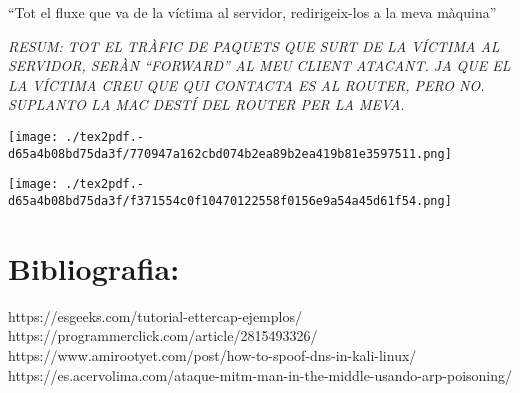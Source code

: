 \documentclass[]{article}
\begin{document}
``Tot el fluxe que va de la víctima al servidor, redirigeix-los a la
meva màquina''

\emph{RESUM: TOT EL TRÀFIC DE PAQUETS QUE SURT DE LA VÍCTIMA AL
SERVIDOR, SERÀN ``FORWARD'' AL MEU CLIENT ATACANT. JA QUE EL LA VÍCTIMA
CREU QUE QUI CONTACTA ES AL ROUTER, PERO NO. SUPLANTO LA MAC DESTÍ DEL
ROUTER PER LA MEVA.}

\texttt{[image: ./tex2pdf.-d65a4b08bd75da3f/770947a162cbd074b2ea89b2ea419b81e3597511.png]}

\texttt{[image: ./tex2pdf.-d65a4b08bd75da3f/f371554c0f10470122558f0156e9a54a45d61f54.png]}

\hypertarget{bibliografia}{%
\section{\texorpdfstring{\textbf{Bibliografia}:}{Bibliografia:}}\label{bibliografia}}

https://esgeeks.com/tutorial-ettercap-ejemplos/
https://programmerclick.com/article/2815493326/
https://www.amirootyet.com/post/how-to-spoof-dns-in-kali-linux/
https://es.acervolima.com/ataque-mitm-man-in-the-middle-usando-arp-poisoning/
\end{document}
